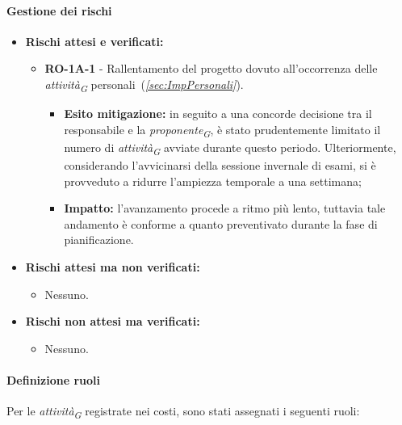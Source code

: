\paragraph{Gestione dei rischi} 
\begin{itemize}
    \item \textbf{Rischi attesi e verificati:}
\begin{itemize}
    \item \textbf{RO-1A-1} - Rallentamento del progetto dovuto all'occorrenza delle \textit{attività}\textsubscript{\textit{G}} personali~(\textit{\ref{sec:ImpPersonali}}).
    \begin{itemize}
        \item \textbf{Esito mitigazione:} 
        in seguito a una concorde decisione tra il responsabile e la \textit{proponente}\textsubscript{\textit{G}}, è stato prudentemente limitato il numero di \textit{attività}\textsubscript{\textit{G}} avviate durante questo periodo. Ulteriormente, considerando l'avvicinarsi della sessione invernale di esami, si è provveduto a ridurre l'ampiezza temporale a una settimana;
        \item \textbf{Impatto:}
        l'avanzamento procede a ritmo più lento, tuttavia tale andamento è conforme a quanto preventivato durante la fase di pianificazione.
    \end{itemize}
\end{itemize}
\item \textbf{Rischi attesi ma non verificati:}
 \begin{itemize}
    \item Nessuno.
\end{itemize}
\item \textbf{Rischi non attesi ma verificati:}
\begin{itemize}
    \item Nessuno.
\end{itemize}
\end{itemize}

\paragraph{Definizione ruoli}
Per le \textit{attività}\textsubscript{\textit{G}} registrate nei costi, sono stati assegnati i seguenti ruoli:

\vspace{0.4cm}


